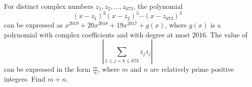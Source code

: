 For distinct complex numbers $z_1,z_2,\ldots,z_{673}$, the polynomial \[\left(x-z_1\right)^3\left(x-z_2\right)^3\cdots\left(x-z_{673}\right)^3\] can be expressed as $x^{2019}+20x^{2018}+19x^{2017}+g\left(x\right)$, where $g\left(x\right)$ is a polynomial with complex coefficients and with degree at most $2016$. The value of \[\left|\displaystyle\sum_{1\leq j<k\leq673}z_jz_j\right|\] can be expressed in the form $\frac{m}{n}$, where $m$ and $n$ are relatively prime positive integers. Find $m+n$.